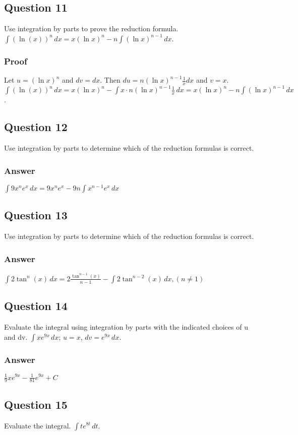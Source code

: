 \documentclass{article}
\begin{document}
\subsection*{Question 11}
Use integration by parts to prove the reduction formula. $\int (\ln(x))^n \,dx = x(\ln x)^n - n\int (\ln x)^{n-1} \,dx$.
\subsubsection*{Proof}
Let $u = (\ln x)^n$ and $dv = dx$. Then $du = n(\ln x)^{n-1}\frac{1}{x}dx$ and $v=x$.
$ \int (\ln(x))^n \,dx = x(\ln x)^n - \int x \cdot n(\ln x)^{n-1}\frac{1}{x} \,dx = x(\ln x)^n - n\int (\ln x)^{n-1} \,dx $.

\subsection*{Question 12}
Use integration by parts to determine which of the reduction formulas is correct.
\subsubsection*{Answer}
$ \int 9x^n e^x \,dx = 9x^n e^x - 9n \int x^{n-1}e^x \,dx $

\subsection*{Question 13}
Use integration by parts to determine which of the reduction formulas is correct.
\subsubsection*{Answer}
$ \int 2\tan^n(x) \,dx = 2\frac{\tan^{n-1}(x)}{n-1} - \int 2\tan^{n-2}(x) \,dx, (n \neq 1) $

\subsection*{Question 14}
Evaluate the integral using integration by parts with the indicated choices of u and dv. $\int xe^{9x} \,dx$; $u=x$, $dv=e^{9x}\,dx$.
\subsubsection*{Answer}
$ \frac{1}{9}xe^{9x} - \frac{1}{81}e^{9x} + C $

\subsection*{Question 15}
Evaluate the integral. $\int te^{8t} \,dt$.
\end{document}
